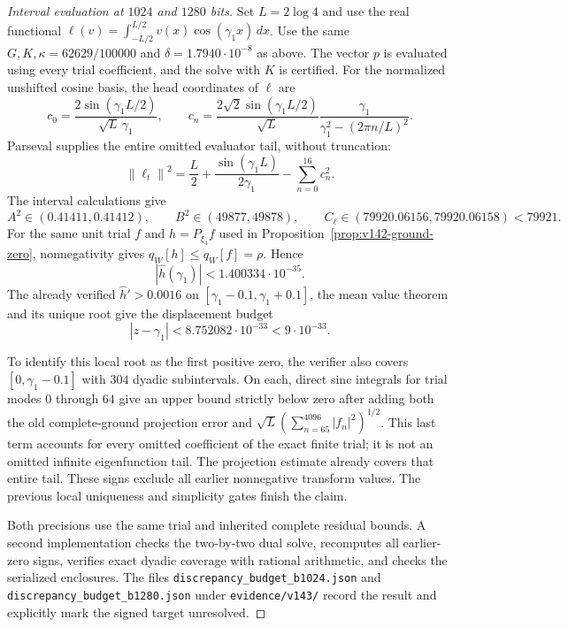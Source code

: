 \documentclass[11pt]{article}
\theoremstyle{remark}
\newcommand{\norm}[1]{\left\lVert #1\right\rVert}
\begin{document}
\begin{proof}[Interval evaluation at $1024$ and $1280$ bits]
Set $L=2\log4$ and use the real functional
$\ell(v)=\int_{-L/2}^{L/2}v(x)\cos(\gamma_1x)\,dx$.
Use the same $G,K,\kappa=62629/100000$ and
$\delta=1.7940\cdot10^{-8}$ as above. The vector $p$ is evaluated
using every trial coefficient, and the solve with $K$ is certified.
For the normalized unshifted cosine basis, the head coordinates of
$\ell$ are
\[
 c_0=\frac{2\sin(\gamma_1L/2)}{\sqrt L\,\gamma_1},\qquad
 c_n=\frac{2\sqrt2\sin(\gamma_1L/2)}{\sqrt L}
       \frac{\gamma_1}{\gamma_1^2-(2\pi n/L)^2}.
\]
Parseval supplies the entire omitted evaluator tail, without truncation:
\[
 \norm{\ell_t}^2=\frac L2+\frac{\sin(\gamma_1L)}{2\gamma_1}
                    -\sum_{n=0}^{16}c_n^2.
\]
The interval calculations give
\[
 A^2\in(0.41411,0.41412),\qquad
 B^2\in(49877,49878),\qquad C_\ell\in(79920.06156,79920.06158)<79921.
\]
For the same unit trial $f$ and $h=P_{\xi_4}f$ used in
Proposition~\ref{prop:v142-ground-zero}, nonnegativity gives
$q_W[h]\le q_W[f]=\rho$. Hence
\[
 |\widehat h(\gamma_1)|<1.400334\cdot10^{-35}.
\]
The already verified $\widehat h'>0.0016$ on
$[\gamma_1-0.1,\gamma_1+0.1]$, the mean value theorem and its unique
root give the displacement budget
\[
 |z-\gamma_1|<8.752082\cdot10^{-33}<9\cdot10^{-33}.
\]

To identify this local root as the first positive zero, the verifier
also covers $[0,\gamma_1-0.1]$ with $304$ dyadic subintervals.
On each, direct sinc integrals for trial modes $0$ through $64$ give
an upper bound strictly below zero after adding both the old
complete-ground projection error and
$\sqrt L(\sum_{n=65}^{4096}|f_n|^2)^{1/2}$. This last term accounts
for every omitted coefficient of the exact finite trial; it is not
an omitted infinite eigenfunction tail. The projection estimate
already covers that entire tail. These signs exclude all earlier
nonnegative transform values. The previous local uniqueness and
simplicity gates finish the claim.

Both precisions use the same trial and inherited complete residual
bounds. A second implementation checks the two-by-two dual solve,
recomputes all earlier-zero signs, verifies exact dyadic coverage
with rational arithmetic, and checks the serialized enclosures.
The files \texttt{discrepancy\_budget\_b1024.json} and
\texttt{discrepancy\_budget\_b1280.json} under \texttt{evidence/v143/}
record the result and explicitly mark the signed target unresolved.
\end{proof}
\end{document}
